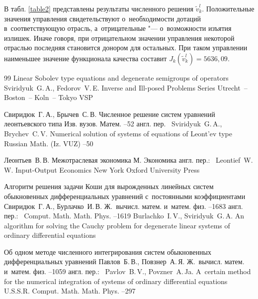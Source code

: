 В табл. \ref{table2} представлены результаты численного решения $\tilde{v}_{k}^{l}$. 
Положительные значения управления свидетельствуют о~необходимости дотаций в~соответствующую отрасль, а~отрицательные "--- о~возможности изъятия излишек. Иначе говоря, при отрицательном значении управления
некоторой отраслью последняя становится донором для остальных.
При таком управлении наименьшее значение функционала качества составит  $J_{k}\left(\tilde{v}_{k}^{l}\right)=5636,09$.



\begin{thebibliography}{99}
\book  Linear Sobolev type equations and degenerate semigroups of operators
\by Sviridyuk~G.\,A., Fedorov~V.\,E.
\serial Inverse and Ill-posed Problems Series
\publaddr Utrecht~-- Boston~-- Koln~-- Tokyo
\publ VSP

\by Свиридюк~Г.\,А., Брычев~С.\,В.
\paper Численное решение систем уравнений леонтьевского типа
\jour Изв. вузов. Матем.
--52
\transl англ. пер.~
\by Sviridyuk~G.\,A., Brychev~C.\,V.
\paper Numerical solution of systems of equations of Leont'ev type
\jour Russian Math. (Iz. VUZ)
--50


\by Леонтьев~В.\,В.
\book Межотраслевая экономика
\publaddr М.
\publ Экономика
\transl англ. пер.:~
\by Leontief~W.\,W.
\book Input-Output Economics
\publaddr New York
\publ Oxford University Press



\paper Алгоритм решения задачи Коши для вырожденных линейных систем обыкновенных дифференциальных уравнений с~постоянными коэффициентами
\by Свиридюк~Г.\,А., Бурлачко~И.\,В.
\jour Ж.~вычисл. матем. и~матем. физ.
--1683
\transl \mbox{англ.} пер.:~
\jour Comput. Math. Math. Phys.
--1619
\by Burlachko~I.\,V., Sviridyuk~G.\,A.
\paper An algorithm for solving the Cauchy problem for degenerate linear systems of ordinary differential equations
       
       
\paper Об одном методе численного интегрирования систем обыкновенных дифференциальных уравнений
\by Павлов~Б.\,В., Повзнер~А.\,Я.
\jour Ж.~вычисл. матем. и~матем. физ.
--1059
\transl англ. пер.:~
\by Pavlov~B.\,V., Povzner~A.\,Ja.
\paper A~certain method for the numerical integration of systems of ordinary differential equations
\jour U.S.S.R. Comput. Math. Math. Phys.
--297        
        

\end{thebibliography}
